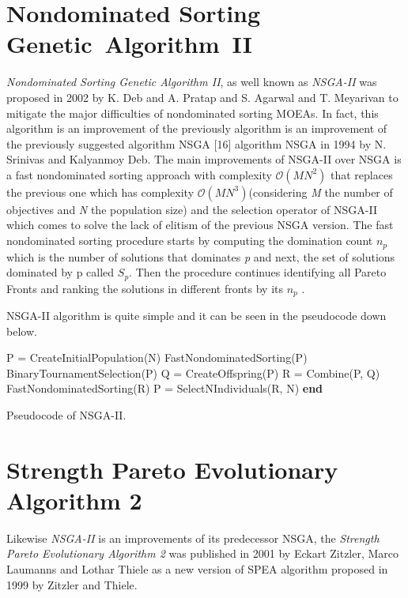 \section{Nondominated Sorting Genetic~Algorithm~II}
\textit{Nondominated Sorting Genetic Algorithm II}, as well known as \textit{NSGA-II} was proposed in 2002 by K. Deb and A. Pratap and S. Agarwal and T. Meyarivan to mitigate the major difficulties of nondominated sorting MOEAs\cite{996017}. In fact, this algorithm is an improvement of the previously algorithm is an improvement of the previously suggested algorithm NSGA [16] algorithm NSGA\cite{Srinivas1994MuiltiobjectiveOU} in 1994 by N. Srinivas and Kalyanmoy Deb.
The main improvements of NSGA-II over NSGA is a fast nondominated sorting approach with complexity $\mathcal{O}(MN^{2})$ that replaces the previous one which has complexity $\mathcal{O}(MN^{3})$\cite{996017}(considering \textit{M} the number of objectives and \textit{N} the population size) and the selection operator of NSGA-II which comes to solve the lack of elitism of the previous NSGA version. The fast nondominated sorting procedure starts by computing the domination count $n_{p}$ which is the number of solutions that dominates \textit{p} and next, the set of solutions dominated by p called \textit{$S_{p}$}. Then the procedure continues identifying all Pareto Fronts and ranking the solutions in different fronts by its $n_{p}$\cite{996017} .

NSGA-II algorithm is quite simple and it can be seen in the pseudocode down below.

\begin{algorithm}[H]
\begin{algorithmic}[1]
\State P = CreateInitialPopulation(N)\;
\State  FastNondominatedSorting(P)\;
    \State BinaryTournamentSelection(P)\;
    \State Q = CreateOffspring(P)\;
    \State R = Combine(P, Q)\;
    \State FastNondominatedSorting(R)\;
    \State P = SelectNIndividuals(R, N)\;
  \EndWhile
  \State \textbf{end}
\end{algorithmic}
\caption{Pseudocode of NSGA-II.}
\end{algorithm}

\section{Strength Pareto Evolutionary Algorithm 2}
Likewise \textit{NSGA-II} is an improvements of its predecessor NSGA, the \textit{Strength Pareto Evolutionary Algorithm 2} was published in 2001 by Eckart Zitzler, Marco Laumanns and Lothar Thiele as a new version of SPEA algorithm proposed in 1999 by Zitzler and Thiele\cite{SPEA2}.

